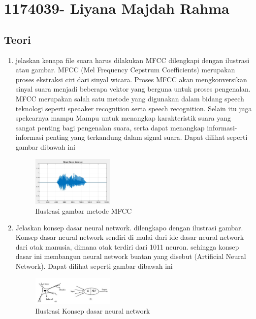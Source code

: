 \section{1174039- Liyana Majdah Rahma}
    \subsection{Teori}
    \begin{enumerate}
        \item jelaskan kenapa file suara harus dilakukan MFCC dilengkapi dengan ilustrasi atau gambar.
        \subitem MFCC (Mel Frequency Cepstrum Coefficients) merupakan proses ekstraksi ciri dari sinyal wicara. Proses MFCC akan mengkonversikan sinyal suara menjadi beberapa vektor yang berguna untuk proses pengenalan. MFCC merupakan salah satu metode yang digunakan dalam bidang speech teknologi seperti speaaker recognition serta speech recognition. Selain itu juga spekearnya mampu Mampu untuk menangkap karakteristik suara yang sangat penting bagi pengenalan suara, serta dapat menangkap informasi-informasi penting yang terkandung dalam signal suara. Dapat dilihat seperti gambar dibawah ini
        \begin{figure}[H]
            \includegraphics[width=4cm]{figures/1174039/chapter6/teori1.png}
            \centering
            \caption{Ilustrasi gambar metode MFCC}
        \end{figure}
        
        \item Jelaskan konsep dasar neural network. dilengkapo dengan ilustrasi gambar.
        \subitem Konsep dasar neural network sendiri di mulai dari ide dasar neural network dari otak manusia, dimana otak terdiri dari 1011 neuron. sehingga konsep dasar ini membangun neural network buatan yang disebut (Artificial Neural Network). Dapat dilihat seperti gambar dibawah ini
        \begin{figure}[H]
            \includegraphics[width=4cm]{figures/1174039/chapter6/teori2.png}
            \centering
            \caption{Ilustrasi Konsep dasar neural network}
        \end{figure}
        

\end{enumerate}
